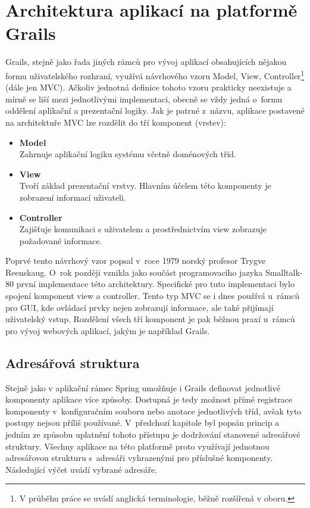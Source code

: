 \chapter{Architektura aplikací na platformě Grails}
Grails, stejně jako řada jiných rámců pro vývoj aplikací obsahujících nějakou formu uživatelského rozhraní, využívá návrhového vzoru Model, View, Controller\footnote{V průběhu práce se uvádí anglická terminologie, běžně rozšířená v oboru.} (dále jen MVC). Ačkoliv jednotná definice tohoto vzoru prakticky neexistuje a mírně se liší mezi jednotlivými implementaci, obecně se vždy jedná o~formu oddělení aplikační a prezentační logiky. Jak je patrné z~názvu, aplikace postavené na architektuře MVC lze rozdělit do tří komponent (vrstev):

\begin{itemize}
\item \textbf{Model}\\
Zahrnuje aplikační logiku systému včetně doménových tříd.
\item \textbf{View}\\
Tvoří základ prezentační vrstvy. Hlavním účelem této komponenty je zobrazení informací uživateli.
\item \textbf{Controller}\\
Zajišťuje komunikaci s uživatelem a prostřednictvím view zobrazuje požadované informace.
\end{itemize}

Poprvé tento návrhový vzor popsal v~roce 1979 norský profesor Trygve Reenskaug. O~rok později vznikla jako součást programovacího jazyka Smalltalk-80 první implementace této architektury. Specifické pro tuto implementaci bylo spojení komponent view a controller. Tento typ MVC se i dnes používá u~rámců pro GUI, kde ovládací prvky nejen zobrazují informace, ale také přijímají uživatelský vstup. Rozdělení všech tří komponent je pak běžnou praxí u~rámců pro vývoj webových aplikací, jakým je například Grails.

\section{Adresářová struktura}
Stejně jako v aplikační rámec Spring umožňuje i Grails definovat jednotlivé komponenty aplikace více způsoby. Dostupná je tedy možnost přímé registrace komponenty v~konfiguračním souboru nebo anotace jednotlivých tříd, avšak tyto postupy nejsou příliš používané. V~předchozí kapitole byl popsán princip   a jedním ze způsobu uplatnění tohoto přístupu je dodržování stanovené adresářové struktury. Všechny aplikace na této platformě proto využívají jednotnou adresářovou strukturu s~adresáři vyhrazenými pro příslušné komponenty. Následující výčet uvádí vybrané adresáře.\cite{grails-documentation}

